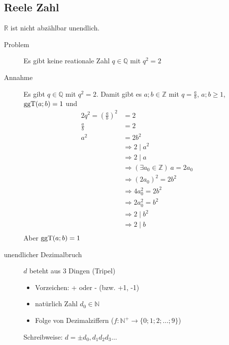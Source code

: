 \subsection{Reele Zahl}
$\mathbb{R}$ ist nicht abzählbar unendlich.
\begin{description}
    \item[Problem] Es gibt keine reationale Zahl $q \in \mathbb{Q}$ mit $q^2 = 2$
    \item[Annahme] Es gibt $q \in \mathbb{Q}$ mit $q^2 = 2$. Damit gibt es $a;b \in \mathbb{Z}$ mit $q = \frac{a}{b}$, $a;b \geq 1$, $\operatorname{ggT}(a;b) = 1$ und
    \begin{alignat*}{2}
        q^2 = \left( \frac{a}{b}\right)^2 & = 2                                                \\
        \frac{a}{b}                       & = 2                                                \\
        a^2                               & = 2b^2                                             \\
        & \Rightarrow 2 \mid a^2                             \\
        & \Rightarrow 2 \mid a                               \\
        & \Rightarrow (\exists a_0 \in \mathbb{Z})\ a = 2a_0 \\
        & \Rightarrow \left(2a_0\right)^2 = 2b^2             \\
        & \Rightarrow 4a_0^2 = 2b^2                          \\
        & \Rightarrow 2a_0^2 = b^2                           \\
        & \Rightarrow 2 \mid b^2                             \\
        & \Rightarrow 2 \mid b                               \\
    \end{alignat*}
    Aber $\operatorname{ggT}(a;b) = 1$
    \item[unendlicher Dezimalbruch] $d$ beteht aus 3 Dingen (Tripel)
    \begin{itemize}
        \item Vorzeichen: + oder - (bzw. +1, -1)
        \item natürlich Zahl $d_0 \in \mathbb{N}$
        \item Folge von Dezimalziffern ($f : \mathbb{N}^+ \longrightarrow \lbrace 0; 1; 2; \dots ; 9 \rbrace$)
    \end{itemize}
    Schreibweise: $d = \pm d_0,d_1d_2d_3\dots$\\

\end{description}
